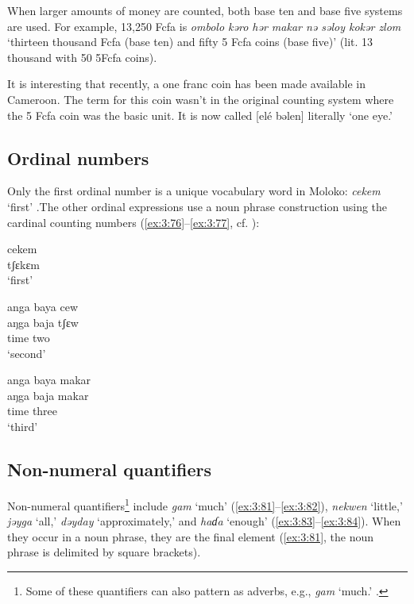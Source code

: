 When larger amounts of money are counted, both base ten and base five systems are used. For example, 13,250 Fcfa is \textit{ombolo kəro hər makar nə səloy kokər zlom} ‘thirteen thousand Fcfa (base ten) and fifty 5 Fcfa coins (base five)’ (lit. 13 thousand with 50 5Fcfa coins).

It is interesting that recently, a one franc coin has been made available in Cameroon. The term for this coin wasn’t in the original counting system where the 5 Fcfa coin was the basic unit. It is now called [el\'{e} bəlen] literally ‘one eye.’ 

\subsection{Ordinal numbers}\label{sec:3.3.3}
\hypertarget{RefHeading1211081525720847}{}
Only the first ordinal number is a unique vocabulary word in Moloko: \textit{cekem} ‘first’ .The other ordinal expressions use a noun phrase construction using the cardinal counting numbers (\ref{ex:3:76}--\ref{ex:3:77}, cf. ):

\ea \label{ex:3:78}
cekem\\
      tʃɛkɛm\\
\glt  ‘first’
\z

\ea \label{ex:3:79}
anga  baya cew\\
\gll  aŋga baja   tʃɛw\\
      {\POSS}   time     two\\
\glt  ‘second’
\z

\ea \label{ex:3:80}
anga  baya  makar\\
\gll  aŋga   baja   makar\\
      {\POSS}   time     three\\
\glt  ‘third’ 
\z

\subsection{Non-numeral quantifiers}\label{sec:3.3.4}
\hypertarget{RefHeading1211101525720847}{}
Non-numeral quantifiers\footnote{Some of these quantifiers can also pattern as adverbs, e.g., \textit{gam} ‘much.’ .} include \textit{gam} ‘much' (\ref{ex:3:81}--\ref{ex:3:82}), \textit{nekwen} ‘little,’ \textit{jəyga} ‘all,’ \textit{dəyday} ‘approximately,’ and \textit{haɗa} ‘enough’ (\ref{ex:3:83}--\ref{ex:3:84}). When they occur in a noun phrase, they are the final element (\ref{ex:3:81}, the noun phrase is delimited by square brackets).  


